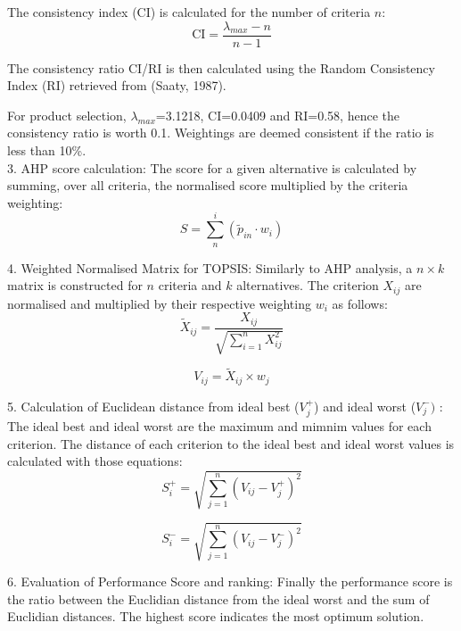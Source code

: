 The consistency index (CI) is calculated for the number of criteria $n$:
\begin{equation}
   \mathrm{CI} = \frac{\lambda_{max}-n}{n-1}
\end{equation}

The consistency ratio CI/RI is then calculated using the Random Consistency Index (RI) retrieved from (Saaty, 1987). 

For product selection, $\lambda_{max}$=3.1218, CI=0.0409 and RI=0.58, hence the consistency ratio is worth 0.1. Weightings are deemed consistent if the ratio is less than 10\%.\\

3. AHP score calculation: The score for a given alternative is calculated by summing, over all criteria, the normalised score multiplied by the criteria weighting:
\begin{equation}
    S=\sum^{i}_{n}(\tilde{p}_{in} \cdot w_{i})
\end{equation}

4. Weighted Normalised Matrix for TOPSIS:
Similarly to AHP analysis, a $n\times k$ matrix is constructed for $n$ criteria and $k$ alternatives. The criterion $X_{ij}$ are normalised and multiplied by their respective weighting $w_i$ as follows:
\begin{equation}
    \tilde{X}_{ij}=\frac{X_{ij}}{\sqrt{\sum^{n}_{i=1}X_{ij}^{2}}}
\end{equation}

\begin{equation}
    V_{ij}=\tilde{X}_{ij}\times w_j
\end{equation}

5. Calculation of Euclidean distance from ideal best ($V_{j}^{+}$) and ideal worst ($V_{j}^{-})$ :
The ideal best and ideal worst are the maximum and mimnim values for each criterion. The distance of each criterion to the ideal best and ideal worst values is calculated with those equations:
\begin{equation}
    S_{i}^{+}=\sqrt{\sum_{j=1}^{n}(V_{ij}-V_{j}^{+})^2}
\end{equation}

\begin{equation}
    S_{i}^{-}=\sqrt{\sum_{j=1}^{n}(V_{ij}-V_{j}^{-})^2}
\end{equation}

6. Evaluation of Performance Score and ranking:
Finally the performance score is the ratio between the Euclidian distance from the ideal worst and the sum of Euclidian distances. The highest score indicates the most optimum solution.

